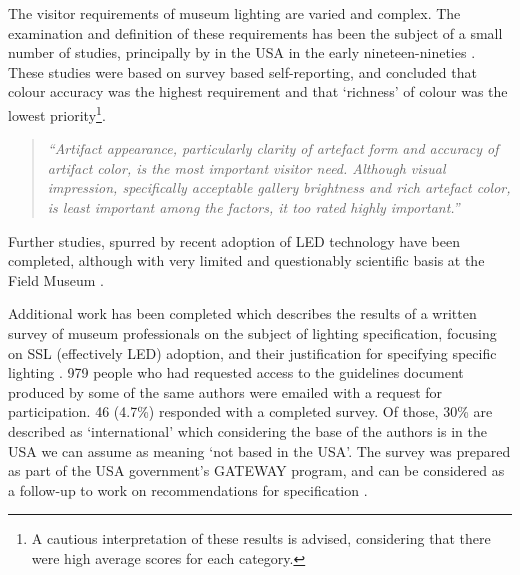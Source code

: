 The visitor requirements of museum lighting are varied and complex. The examination and definition of these requirements has been the subject of a small number of studies, principally by \citet{kesner_museum_1993-1} in the USA in the early nineteen-nineties \citep{kesner_museum_1993,kesner_exhibition_1992,kesner_current_1991,kesner_analysis_1997}. These studies were based on survey based self-reporting, and concluded that colour accuracy was the highest requirement and that `richness' of colour was the lowest priority\footnote{A cautious interpretation of these results is advised, considering that there were high average scores for each category.}.

\begin{quote}
\emph{``Artifact appearance, particularly clarity of artefact form and accuracy of artifact color, is the most important visitor need. Although visual impression, specifically acceptable gallery brightness and rich artefact color, is least important among the factors, it too rated highly important.''} \citet{kesner_museum_1993-1}
\end{quote}

Further studies, spurred by recent adoption of \gls{LED} technology have been completed, although with very limited and questionably scientific basis at the Field Museum \citep{myer_demonstration_2010}.

Additional work has been completed which describes the results of a written survey of museum professionals on the subject of lighting specification, focusing on SSL (effectively \gls{LED}) adoption, and their justification for specifying specific lighting \citep{perrin_ssl_2014}. 979 people who had requested access to the guidelines document produced by some of the same authors \citep{druzik_guidelines_2012} were emailed with a request for participation. 46 (4.7\%) responded with a completed survey. Of those, 30\% are described as `international' which considering the base of the authors is in the USA we can assume as meaning `not based in the USA'. The survey was prepared as part of the USA government's GATEWAY program, and can be considered as a follow-up to work on recommendations for specification \citep{druzik_guidelines_2012}. 

